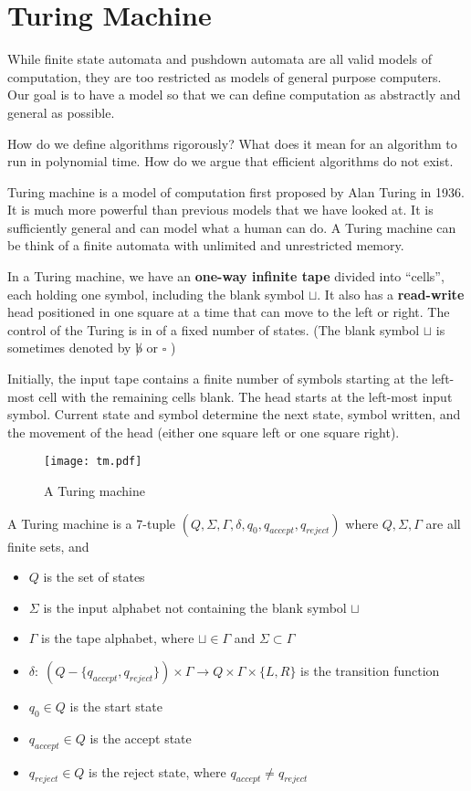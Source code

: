 \section{Turing Machine}

While finite state automata and pushdown automata are all valid models of computation, they are too restricted as models of general purpose computers. Our goal is to have a model so that we can define computation as abstractly and general as possible.

How do we define algorithms rigorously? What does it mean for an algorithm to run in polynomial time. How do we argue that efficient algorithms do not exist.

Turing machine is a model of computation first proposed by Alan Turing in 1936. It is much more powerful than previous models that we have looked at. It is sufficiently general and can model what a human can do. A Turing machine can be think of a finite automata with unlimited and unrestricted memory.

In a Turing machine, we have an \textbf{one-way infinite tape} divided into ``cells'', each holding one symbol, including the blank symbol $\sqcup$. It also has a \textbf{read-write} head positioned in one square at a time that can move to the left or right. The control of the Turing is in of a fixed number of states. (The blank symbol $\sqcup$ is sometimes denoted by $\not b$ or $\square$ )

Initially, the input tape contains a finite number of symbols starting at the left-most cell with the remaining cells blank. The head starts at the left-most input symbol. Current state and symbol determine the next state, symbol written, and the movement of the head (either one square left or one square right).

\begin{figure}[htbp]
    \centering
    \texttt{[image: tm.pdf]}
    \caption{A Turing machine}
    \label{fig:tm}
\end{figure}

\begin{definition}
    A Turing machine is a 7-tuple $(Q,\Sigma,\Gamma,\delta,q_0,q_{accept},q_{reject})$ where $Q,\Sigma,\Gamma$ are all finite sets, and
    \begin{itemize}
        \item $Q$ is the set of states
        \item $\Sigma$ is the input alphabet not containing the blank symbol $\sqcup$
        \item $\Gamma$ is the tape alphabet, where $\sqcup \in \Gamma$ and $\Sigma \subset \Gamma$
        \item $\delta:\;(Q-\{q_{accept},q_{reject}\}) \times \Gamma \to Q \times \Gamma \times \{L,R\}$ is the transition function
        \item $q_0 \in Q$ is the start state
        \item $q_{accept} \in Q$ is the accept state
        \item $q_{reject} \in Q$ is the reject state, where $q_{accept} \neq q_{reject}$ 
    \end{itemize}
\end{definition}

